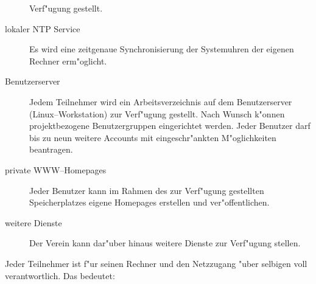\begin{description}
      Verf"ugung gestellt.
  \item[lokaler NTP Service] Es wird eine zeitgenaue
      Synchronisierung der Systemuhren der eigenen Rechner erm"oglicht.
  \item[Benutzerserver] Jedem Teilnehmer wird ein
      Arbeitsverzeichnis auf dem Benutzerserver (Linux--Workstation)
      zur Verf"ugung gestellt. Nach Wunsch k"onnen projektbezogene
      Benutzergruppen eingerichtet werden. Jeder Benutzer darf bis zu neun
      weitere Accounts mit eingeschr"ankten M"oglichkeiten beantragen.
  \item[private WWW--Homepages] Jeder Benutzer kann im
      Rahmen des zur Verf"u\-gung gestellten Speicherplatzes eigene \glossar
      Homepages erstellen und ver"offentlichen.
  \item[weitere Dienste] Der Verein kann dar"uber
      hinaus weitere Dienste zur Verf"u\-gung stellen.
\end{description}


Jeder Teilnehmer ist f"ur seinen Rechner und den Netzzugang "uber selbigen
voll verantwortlich. Das bedeutet:

